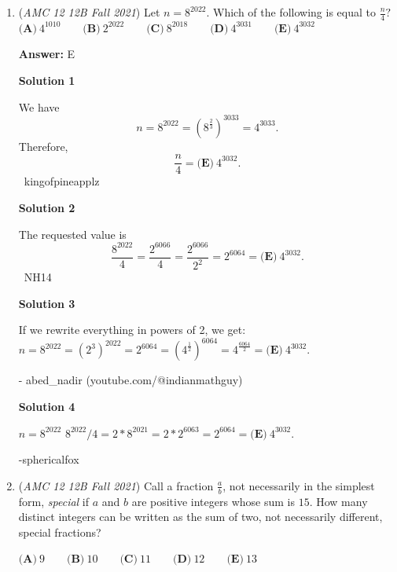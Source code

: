 \begin{enumerate}
\textbf{Solution 3}

Let the temperature in Minneapolis be $N$. Then St. Louis is $0$ degrees. $N - 5 = 3 \pm 2$, $N = -10, -6$, $-10 \cdot -6 = \boxed{\textbf{(C)} \: 60}$.

 


	\item (\textit{AMC 12 12B Fall 2021}) Let $n=8^{2022}$. Which of the following is equal to $\frac{n}{4}?$
$\textbf{(A)}\: 4^{1010}\qquad\textbf{(B)} \: 2^{2022}\qquad\textbf{(C)} \: 8^{2018}\qquad\textbf{(D)} \: 4^{3031}\qquad\textbf{(E)} \: 4^{3032}$

 \textbf{Answer: }E



\textbf{Solution 1}

We have 
 \[n=8^{2022}=  \left(8^\frac{2}{3}\right)^{3033}=4^{3033}.\]Therefore, 
 \[\frac{n}4=\boxed{\textbf{(E)} \: 4^{3032}}.\]~kingofpineapplz

 



\textbf{Solution 2}

The requested value is 
 \[\frac{8^{2022}}{4} = \frac{2^{6066}}{4} = \frac{2^{6066}}{2^2} = 2^{6064} = \boxed{\textbf{(E)} \: 4^{3032}}.\]~NH14

 



\textbf{Solution 3}

If we rewrite everything in powers of 2, we get:$n = 8^{2022} = (2^{3})^{2022} = 2^{6064} = (4^{\frac{1}{2}})^{6064} = 4^{\frac{6064}{2}} = \boxed{\textbf{(E)} \: 4^{3032}}.$

 - abed\_nadir (youtube.com/@indianmathguy)

 



\textbf{Solution 4}

$n = 8^{2022}$
${8^{2022}}/{4} = 2 * 8^{2021} = 2 * 2^{6063} = 2^{6064} = \boxed{\textbf{(E)} \: 4^{3032}}.$

 -sphericalfox

 


	\item (\textit{AMC 12 12B Fall 2021}) Call a fraction $\frac{a}{b}$, not necessarily in the simplest form, \textit{special} if $a$ and $b$ are positive integers whose sum is $15$. How many distinct integers can be written as the sum of two, not necessarily different, special fractions?


 $\textbf{(A)}\ 9 \qquad\textbf{(B)}\  10 \qquad\textbf{(C)}\  11 \qquad\textbf{(D)}\ 12 \qquad\textbf{(E)}\ 13$


\end{enumerate}
